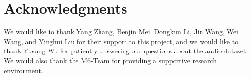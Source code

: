 \documentclass{article}
\begin{document}






\section*{Acknowledgments}
We would like to thank Yang Zhang, Benjin Mei, Dongkun Li, Jin Wang, Wei Wang, and Yinghui Liu for their support to this project, and we would like to thank Yusong Wu for patiently answering our questions about the audio dataset. We would also thank the M6-Team for providing a supportive research environment.

  


\newpage
\appendix

\end{document}
